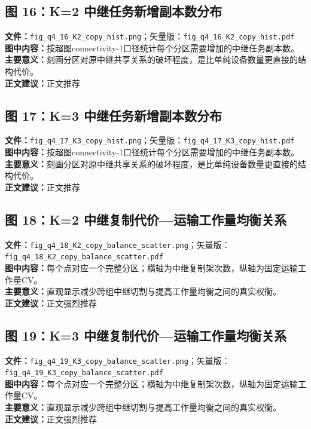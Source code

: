 \subsection*{图 16：K=2 中继任务新增副本数分布}
\textbf{文件：}\texttt{fig\_q4\_16\_K2\_copy\_hist.png}；矢量版：\texttt{fig\_q4\_16\_K2\_copy\_hist.pdf}\\
\textbf{图中内容：}按超图connectivity-1口径统计每个分区需要增加的中继任务副本数。\\
\textbf{主要意义：}刻画分区对原中继共享关系的破坏程度，是比单纯设备数量更直接的结构代价。\\
\textbf{正文建议：}正文推荐

\subsection*{图 17：K=3 中继任务新增副本数分布}
\textbf{文件：}\texttt{fig\_q4\_17\_K3\_copy\_hist.png}；矢量版：\texttt{fig\_q4\_17\_K3\_copy\_hist.pdf}\\
\textbf{图中内容：}按超图connectivity-1口径统计每个分区需要增加的中继任务副本数。\\
\textbf{主要意义：}刻画分区对原中继共享关系的破坏程度，是比单纯设备数量更直接的结构代价。\\
\textbf{正文建议：}正文推荐

\subsection*{图 18：K=2 中继复制代价—运输工作量均衡关系}
\textbf{文件：}\texttt{fig\_q4\_18\_K2\_copy\_balance\_scatter.png}；矢量版：\texttt{fig\_q4\_18\_K2\_copy\_balance\_scatter.pdf}\\
\textbf{图中内容：}每个点对应一个完整分区；横轴为中继复制架次数，纵轴为固定运输工作量CV。\\
\textbf{主要意义：}直观显示减少跨组中继切割与提高工作量均衡之间的真实权衡。\\
\textbf{正文建议：}正文强烈推荐

\subsection*{图 19：K=3 中继复制代价—运输工作量均衡关系}
\textbf{文件：}\texttt{fig\_q4\_19\_K3\_copy\_balance\_scatter.png}；矢量版：\texttt{fig\_q4\_19\_K3\_copy\_balance\_scatter.pdf}\\
\textbf{图中内容：}每个点对应一个完整分区；横轴为中继复制架次数，纵轴为固定运输工作量CV。\\
\textbf{主要意义：}直观显示减少跨组中继切割与提高工作量均衡之间的真实权衡。\\
\textbf{正文建议：}正文强烈推荐

